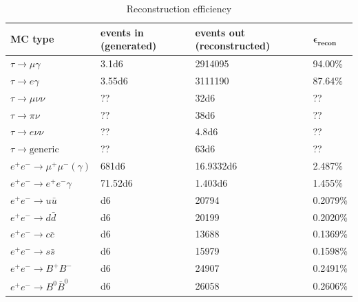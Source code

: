 \documentclass[12pt]{thesis}  %
\begin{document}
\begin{table}[h]
\centering
\begin{tabular}{llll}
\textbf{MC type}         & \textbf{events in (generated)} & \textbf{events out (reconstructed)} & $\mathbf{\epsilon_{\text{recon}}}$ \\ \hline 
\rowcolor[HTML]{EFEFEF} 
$\tau\to\mu\gamma$       & \num{3.1d6}        & 2914095             & 94.00\%                            \\
\rowcolor[HTML]{EFEFEF} 
$\tau\to e \gamma$      & \num{3.55d6}       & 3111190             & 87.64\%                            \\
$\tau\to\mu\nu\nu$      & ??                 & \num{32d6}          & ??                                 \\
$\tau\to\pi\nu$         & ??                 & \num{38d6}          & ??                                 \\
$\tau\to e\nu\nu$       & ??                 & \num{4.8d6}         & ??                                 \\
$\tau\to\text{generic}$  & ??                 & \num{63d6}          & ??                                 \\
$e^+ e^- \to \mu^+ \mu^- (\gamma)$       & \num{681d6}        & \num{16.9332d6}     & 2.487\%             \\
$e^+ e^- \to e^+ e^- \gamma$      & \num{71.52d6}      & \num{1.403d6}       & 1.455\%                            \\
$e^+ e^- \to u \bar{u}$       & \num{d6}           & 20794               & 0.2079\%                           \\
$e^+ e^- \to d \bar{d}$        & \num{d6}           & 20199               & 0.2020\%                           \\
$e^+ e^- \to c \bar{c}$        & \num{d6}           & 13688               & 0.1369\%                           \\
$e^+ e^- \to s \bar{s}$       & \num{d6}           & 15979               & 0.1598\%                           \\
$e^+ e^- \to B^+ B^-$     & \num{d6}           & 24907               & 0.2491\%                           \\
$e^+ e^- \to B^0 \bar{B}^0$       & \num{d6}           & 26058               & 0.2606\%                          
\end{tabular}
\caption{Reconstruction efficiency}
\label{my-label}
\end{table}
\end{document}
